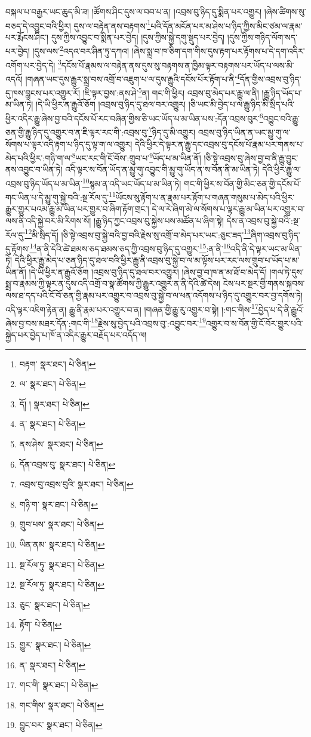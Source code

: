 བསྐལ་པ་བརྒྱར་ཡང་ཆུད་མི་ཟ། །ཚོགས་ཤིང་དུས་ལ་བབ་པ་ན། །འབྲས་བུ་ཉིད་དུ་སྨིན་པར་འགྱུར། །ཞེས་ཚིགས་སུ་བཅད་དེ་འབྱུང་བའི་ཕྱིར། དུས་ལ་བརྟེན་ནས་བརྟགས་\footnote{བརྟག་  སྣར་ཐང་།  པེ་ཅིན། }པའི་དོན་མངོན་པར་མ་ཤེས་པ་ཉིད་ཀྱིས་མིང་ཙམ་ལ་རྣམ་པར་རྨོངས་ཤིང་། དུས་ཀྱིས་འབྱུང་བ་སྨིན་པར་བྱེད། །དུས་ཀྱིས་སྐྱེ་དགུ་སྡུད་པར་བྱེད། །དུས་ཀྱིས་གཉིད་ལོག་སད་པར་བྱེད། །དུས་ལས་\footnote{ལ་  སྣར་ཐང་།  པེ་ཅིན། }འདའ་བར་ཤིན་ཏུ་དཀའ། །ཞེས་སྨྲ་བ་ཁ་ཅིག་དག་གིས་དུས་རྟག་པར་རྟོགས་པ་དེ་དག་འདིར་འགོག་པར་བྱེད་དེ། \footnote{དོ། །   སྣར་ཐང་།  པེ་ཅིན། }དངོས་པོ་རྣམས་ལ་བརྟེན་ནས་དུས་སུ་བརྟགས་ན་ཁྱིམ་ལྟར་བརྟགས་པར་ཡོད་པ་ལས་མི་འདའོ། །གཞན་ཡང་དུས་རྒྱུར་སྨྲ་བས་འགྲོ་བ་འཇུག་པ་ལ་དུས་རྒྱུའི་དངོས་པོར་རྟོག་པ་ནི་\footnote{ན་  སྣར་ཐང་།  པེ་ཅིན། }དོན་གྱིས་འབྲས་བུ་ཉིད་དུ་ཁས་བླངས་པར་འགྱུར་རོ། །ཇི་ལྟར་བྱས་:ནས་ཤེ་\footnote{ནས་ཤེས་  སྣར་ཐང་།  པེ་ཅིན། }ན། གང་གི་ཕྱིར། འབྲས་བུ་མེད་པར་རྒྱུ་ལ་ནི། །རྒྱུ་ཉིད་ཡོད་པ་མ་ཡིན་ཏེ། །དེ་ཡི་ཕྱིར་ན་རྒྱུའོ་ཅོག །འབྲས་བུ་ཉིད་དུ་ཐལ་བར་འགྱུར། །ཅི་ཡང་མི་བྱེད་པ་ལ་རྒྱུ་ཉིད་མི་སྲིད་པའི་ཕྱིར་འདིར་རྒྱུ་ཞེས་བྱ་བའི་དངོས་པོ་རང་བཞིན་གྱིས་ཅི་ཡང་ཡོད་པ་མ་ཡིན་པས་:དོན་འབྲས་བུར་\footnote{དོན་འབྲས་བུ་  སྣར་ཐང་།  པེ་ཅིན། }འབྱུང་བའི་རྒྱུ་ཅན་གྱི་རྒྱུ་ཉིད་དུ་འགྱུར་བ་ན་ཇི་ལྟར་རང་གི་:འབྲས་བུ་\footnote{འབྲས་བུ་འབྲས་བུའི་  སྣར་ཐང་།  པེ་ཅིན། }ཉིད་དུ་མི་འགྱུར། འབྲས་བུ་ཉིད་ཡིན་ན་ཡང་མྱུ་གུ་ལ་སོགས་པ་ལྟར་འདི་རྟག་པ་ཉིད་དུ་ལྟ་ག་ལ་འགྱུར། དེའི་ཕྱིར་དེ་ལྟར་ན་རྒྱུ་དང་འབྲས་བུ་དངོས་པོ་རྣམ་པར་གནས་པ་མེད་པའི་ཕྱིར་:གཉི་ག་ལ་\footnote{གཉི་ག་  སྣར་ཐང་།  པེ་ཅིན། }ཡང་རང་གི་ངོ་བོས་:གྲུབ་པ་\footnote{གྲུབ་པས་  སྣར་ཐང་།  པེ་ཅིན། }ཡོད་པ་མ་ཡིན་ནོ། །ཅི་སྟེ་འབྲས་བུ་ཞེས་བྱ་བ་ནི་རྒྱུ་བྱུང་ནས་འབྱུང་བ་ཡིན་ཏེ། འདི་ལྟར་ས་བོན་ཡོད་ན་མྱུ་གུ་འབྱུང་གི་མྱུ་གུ་ཡོད་ན་ས་བོན་ནི་མ་ཡིན་ཏེ། དེའི་ཕྱིར་རྒྱུ་ལ་འབྲས་བུ་ཉིད་ཡོད་པ་མ་ཡིན་\footnote{ཡིན་ནམ་  སྣར་ཐང་།  པེ་ཅིན། }སྙམ་ན་འདི་ཡང་ཡོད་པ་མ་ཡིན་ཏེ། གང་གི་ཕྱིར་ས་བོན་གྱི་མིང་ཅན་གྱི་དངོས་པོ་གང་ཡིན་པ་དེ་མྱུ་གུ་སྐྱེ་བའི་:སྔ་རོལ་དུ་\footnote{སྔ་རོལ་ཏུ་  སྣར་ཐང་།  པེ་ཅིན། }ཡོངས་སུ་རྟོག་པ་ན་རྣམ་པར་རྟོག་པ་གཞན་གསུམ་པ་མེད་པའི་ཕྱིར་རྒྱུར་གྱུར་པའམ་རྒྱུ་མ་ཡིན་པར་གྱུར་བ་ཞིག་རྟོག་གྲང་། དེ་ལ་རེ་ཞིག་མེ་ལ་སོགས་པ་ལྟར་རྒྱུ་མ་ཡིན་པར་འགྱུར་བ་ལས་ནི་འདི་སྐྱེ་བར་མི་རིགས་སོ། །རྒྱུ་ཉིད་ཀྱང་འབྲས་བུ་སྐྱེས་པས་མཚོན་པ་ཞིག་སྟེ། དེས་ན་འབྲས་བུ་སྐྱེ་བའི་:སྔ་རོལ་དུ་\footnote{སྔ་རོལ་ཏུ་  སྣར་ཐང་།  པེ་ཅིན། }མི་སྲིད་དོ། །ཅི་སྟེ་འབྲས་བུ་སྐྱེ་བའི་བྱ་བའི་རྗེས་སུ་འགྲོ་བ་མེད་པར་ཡང་:ཅུང་ཟད་\footnote{ཅུང་  སྣར་ཐང་།  པེ་ཅིན། }ཞིག་འབྲས་བུ་ཉིད་དུ་རྟོགས་\footnote{རྟོག་  པེ་ཅིན། }ན་ནི་དེའི་ཚེ་ཐམས་ཅད་ཐམས་ཅད་ཀྱི་འབྲས་བུ་ཉིད་དུ་འགྱུར་\footnote{གྱུར་  སྣར་ཐང་།  པེ་ཅིན། }:ན་ནི་\footnote{ན་  སྣར་ཐང་།  པེ་ཅིན། }འདི་ནི་དེ་ལྟར་ཡང་མ་ཡིན་ཏེ། དེའི་ཕྱིར་རྒྱུ་མེད་པ་ཅན་ཉིད་དུ་ཐལ་བའི་ཕྱིར་རྒྱུ་ནི་འབྲས་བུ་སྐྱེ་བ་ལ་མ་ལྟོས་པར་རང་ལས་གྲུབ་པ་ཡོད་པ་མ་ཡིན་ནོ། །དེ་ཡི་ཕྱིར་ན་རྒྱུའོ་ཅོག །འབྲས་བུ་ཉིད་དུ་ཐལ་བར་འགྱུར། །ཞེས་བྱ་བ་ཁ་ན་མ་ཐོ་བ་མེད་དོ། །གལ་ཏེ་དུས་སྨྲ་བ་རྣམས་ཀྱི་ལྟར་ན་དུས་འདི་འགྲོ་བ་སྣ་ཚོགས་ཀྱི་རྒྱུར་འགྱུར་ན་ནི་དེའི་ཚེ་དེས། ངེས་པར་སྔར་གྱི་གནས་སྐབས་ལས་ཐ་དད་པའི་ངོ་བོ་ཅན་གྱི་རྣམ་པར་འགྱུར་བ་འབྲས་བུ་སྐྱེ་བ་ལ་ཕན་འདོགས་པ་ཉིད་དུ་འགྱུར་བར་བྱ་དགོས་ཏེ། འདི་ལྟར་འཇིག་རྟེན་ན། རྒྱུ་ནི་རྣམ་པར་འགྱུར་བ་ན། །གཞན་གྱི་རྒྱུ་རུ་འགྱུར་བ་སྟེ། །:གང་གིས་\footnote{གང་གི་  སྣར་ཐང་།  པེ་ཅིན། }བྱེད་པ་དེ་ནི་རྒྱུའོ་ཞེས་བྱ་བས་མཐར་དོན་:གང་གི་\footnote{གང་གིས་  སྣར་ཐང་།  པེ་ཅིན། }རྗེས་སུ་བྱེད་པའི་འབྲས་བུ་:འབྱུང་བར་\footnote{བྱུང་བར་  སྣར་ཐང་།  པེ་ཅིན། }འགྱུར་བ་ས་བོན་གྱི་ངོ་བོར་གྱུར་པའི་སྐྱེད་པར་བྱེད་པ་ཁོ་ན་འདིར་རྒྱུར་བརྗོད་པར་འདོད་ལ། 